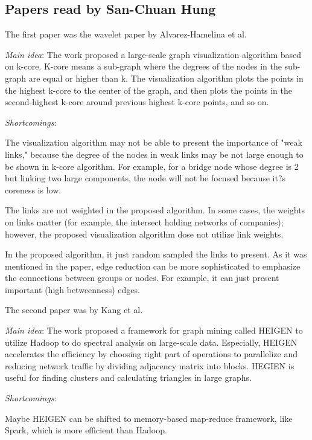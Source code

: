 \subsection{Papers read by San-Chuan Hung }
The first paper was the wavelet paper by Alvarez-Hamelina et al.
\cite{AlvarezHamelin:2005vc}
\begin{itemize*}
\item {\em Main idea}: The work proposed a large-scale graph visualization algorithm based on k-core. K-core means a sub-graph where the degrees of the nodes in the sub-graph are equal or higher than k. The visualization algorithm plots the points in the highest k-core to the center of the graph, and then plots the points in the second-highest k-core around previous highest k-core points, and so on.
\item {\em Shortcomings}:
		\begin{itemize*}
		\item
			The visualization algorithm may not be able to present the importance of "weak links," because the degree of the nodes in weak links may be not large enough to be shown in k-core algorithm. For example, for a bridge node whose degree is 2 but linking two large components, the node will not be focused because it?s coreness is low.
		\item
			The links are not weighted in the proposed algorithm. In some cases, the weights on links matter (for example, the intersect holding networks of companies); however, the proposed visualization algorithm dose not utilize link weights.
		\item
			In the proposed algorithm, it just random sampled the links to present.  As it was mentioned in the paper, edge reduction can be more sophisticated to emphasize the connections between groups or nodes. For example, it can just present important (high betweenness) edges.
		\end{itemize*}
\end{itemize*}

The second paper was by Kang et al.
\cite{Kang:2011vk}
\begin{itemize*}
\item {\em Main idea}: The work proposed a framework for graph mining called HEIGEN to utilize Hadoop to do spectral analysis on large-scale data. Especially, HEIGEN accelerates the efficiency by choosing right part of operations to parallelize and reducing network traffic by dividing adjacency matrix into blocks. HEGIEN is useful for finding clusters and calculating triangles in large graphs.
\item {\em Shortcomings}:
		\begin{itemize*}
		\item
			Maybe HEIGEN can be shifted to memory-based map-reduce framework, like Spark, which is more efficient than Hadoop.
		\end{itemize*}
\end{itemize*}

